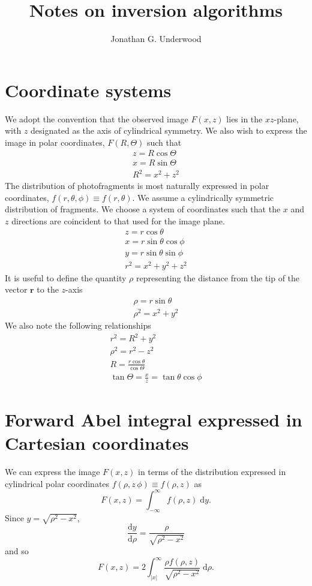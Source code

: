 \documentclass{article}
\title{Notes on inversion algorithms}
\author {Jonathan G. Underwood}
\newcommand{\dee}{\ensuremath{\mathrm{d}}}
\begin{document}
\maketitle
\tableofcontents

\section{Coordinate systems}
We adopt the convention that the observed image $F(x,z)$ lies in the
$xz$-plane, with $z$ designated as the axis of cylindrical symmetry. We also
wish to express the image in polar coordinates, $F(R, \Theta)$ such that
\begin{gather}
  z=R\cos\Theta\\
  x=R\sin\Theta\\
  R^2=x^2+z^2
\end{gather}
The distribution of photofragments is most naturally expressed in polar
coordinates, $f(r, \theta, \phi)\equiv f(r, \theta)$. We assume a
cylindrically symmetric distribution of fragments. We choose a system of
coordinates such that the $x$ and $z$ directions are coincident to that used
for the image plane.
\begin{gather}
  z=r\cos\theta\\
  x=r\sin\theta\cos\phi\\
  y=r\sin\theta\sin\phi\\
  r^2=x^2+y^2+z^2
\end{gather}
It is useful to define the quantity $\rho$ representing the distance from the
tip of the vector $\mathbf{r}$ to the $z$-axis
\begin{gather}
  \rho=r\sin\theta\\
  \rho^2=x^2+y^2
\end{gather}
We also note the following relationships
\begin{gather}
  r^2=R^2+y^2\\
  \rho^2=r^2-z^2\\
  R=\frac{r\cos\theta}{\cos\Theta}\\
  \tan\Theta=\frac{x}{z}=\tan\theta\cos\phi
\end{gather}

\section{Forward Abel integral expressed in Cartesian coordinates}
We can express the image $F(x,z)$ in terms of the distribution expressed in
cylindrical polar coordinates $f(\rho,z\, \phi)\equiv f(\rho, z)$ as 
\begin{equation}
  F(x,z)=\int_{-\infty}^{\infty}
  f(\rho, z)\;\dee{y}.
\end{equation}
Since $y=\sqrt{\rho^2-x^2}$,
\begin{equation}
  \frac{\dee{y}}{\dee{\rho}}
  =\frac{\rho}{\sqrt{\rho^2-x^2}}
\end{equation}
and so
\begin{equation}
  \label{eq:abel_cartesian}
  F(x,z)=2\int_{|x|}^{\infty}
  \frac{\rho f(\rho, z)}{\sqrt{\rho^2-x^2}}
  \;\dee\rho.
\end{equation}
\end{document}
